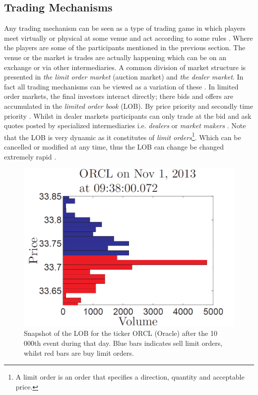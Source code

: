 \documentclass{kththesis}
\theoremstyle{definition}
\begin{document}
\subsection{Trading Mechanisms}
Any trading mechanism can be seen as a type of trading game in which players meet virtually or physical at some venue and act according to some rules \parencite{o1995market}. Where the players are some of the participants mentioned in the previous section. The venue or the market is trades are actually happening which can be on an exchange or via other intermediaries. A common division of market structure is presented in \textcite{foucault2013market} \textit{the limit order market} (auction market) and \textit{the dealer market}. In fact all trading mechanisms can be viewed as a variation of these \parencite{foucault2013market}.
\newline
\newline
In limited order markets, the final investors interact directly; there bids and offers are accumulated in the \textit{limited order book} (LOB). By price priority and secondly time priority \parencite{hasbrouck2007empirical}. Whilst in dealer markets participants can only trade at the bid and ask quotes posted by specialized intermediaries i.e. \textit{dealers} or \textit{market makers} \parencite{foucault2013market}. Note that the LOB is very dynamic as it constitutes of \textit{limit orders}\footnote{A limit order is an order that specifies a direction, quantity and acceptable price.}. Which can be cancelled or modified at any time, thus the LOB can change be changed extremely rapid \parencite{hasbrouck2007empirical}. 

\begin{figure}[H]
    \centering
    \includegraphics[scale=.65]{LOBex.PNG}
    \caption{Snapshot of the LOB for the ticker ORCL (Oracle) after the 10 000th event during that day. Blue bars indicates sell limit orders, whilst red bars are buy limit orders.}
    \label{fig:2}
\end{figure}
\end{document}
